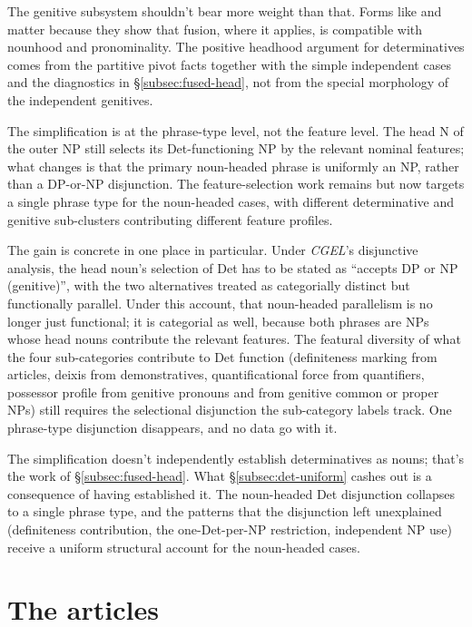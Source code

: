 \documentclass[12pt]{article}
\begin{document}
The genitive subsystem shouldn't bear more weight than that. Forms like  and  matter because they show that fusion, where it applies, is compatible with nounhood and pronominality. The positive headhood argument for determinatives comes from the partitive pivot facts together with the simple independent cases and the diagnostics in §\ref{subsec:fused-head}, not from the special morphology of the independent genitives.

The simplification is at the phrase-type level, not the feature level. The head N of the outer NP still selects its Det-functioning NP by the relevant nominal features; what changes is that the primary noun-headed phrase is uniformly an NP, rather than a DP-or-NP disjunction. The feature-selection work remains but now targets a single phrase type for the noun-headed cases, with different determinative and genitive sub-clusters contributing different feature profiles.

The gain is concrete in one place in particular. Under \textit{CGEL}'s disjunctive analysis, the head noun's selection of Det has to be stated as \enquote{accepts DP or NP (genitive)}, with the two alternatives treated as categorially distinct but functionally parallel. Under this account, that noun-headed parallelism is no longer just functional; it is categorial as well, because both phrases are NPs whose head nouns contribute the relevant features. The featural diversity of what the four sub-categories contribute to Det function (definiteness marking from articles, deixis from demonstratives, quantificational force from quantifiers, possessor profile from genitive pronouns and from genitive common or proper NPs) still requires the selectional disjunction the sub-category labels track. One phrase-type disjunction disappears, and no data go with it.

The simplification doesn't independently establish determinatives as nouns; that's the work of §\ref{subsec:fused-head}. What §\ref{subsec:det-uniform} cashes out is a consequence of having established it. The noun-headed Det disjunction collapses to a single phrase type, and the patterns that the disjunction left unexplained (definiteness contribution, the one-Det-per-NP restriction, independent NP use) receive a uniform structural account for the noun-headed cases.

\section{The articles}\label{sec:articles}
\end{document}
